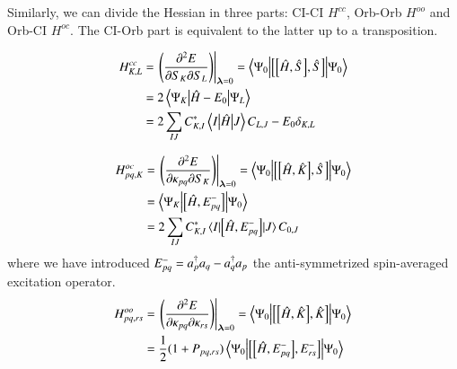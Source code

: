 \documentclass[aps,prb,reprint,showkeys,superscriptaddress]{revtex4-1}
\begin{document}
Similarly, we can divide the Hessian in three parts: CI-CI $H^{cc}$, Orb-Orb $H^{oo}$ and Orb-CI $H^{oc}$. The CI-Orb part is equivalent to the latter up to a transposition.

\begin{align}
  \label{eq:CASSCF_CICI_Hessian}
  H^{cc}_{K,L} &= \eval{\mleft(\pdv{E}{S_{K}}{S_{L}}\mright)}_{\bm{\lambda}=0} = \mel**{\Psi_0}{\com{\com{\hH}{\hS}}{\hS}}{\Psi_0} \\
  &= 2\mel**{\Psi_K}{\hH - E_0}{\Psi_L} \notag \\
  &= 2\sum_{IJ}C_{K,I}^*\mel**{I}{\hH}{J}C_{L,J} - E_0\delta_{K,L} \notag
\end{align}

\begin{align}
  \label{eq:CASSCF_OrbCI_Hessian}
  H^{oc}_{pq,K} &= \eval{\mleft(\pdv{E}{\kappa_{pq}}{S_{K}}\mright)}_{\bm{\lambda}=0} = \mel**{\Psi_0}{\com{\com{\hH}{\hK}}{\hS}}{\Psi_0} \\
                &= \mel**{\Psi_K}{\com{\hH}{E_{pq}^-}}{\Psi_0} \notag \\
                &= 2\sum_{IJ}C_{K,I}^*\mel{I}{\com{\hH}{E_{pq}^-}}{J}C_{0,J} \notag
\end{align}
where we have introduced $E_{pq}^- = a_{p}^\dagger a_{q} - a_{q}^\dagger a_{p}$ the anti-symmetrized spin-averaged excitation operator.
\begin{align}
  \label{eq:MCSCF_SO_OrbOrb_Hessian}
  H^{oo}_{pq,rs} &= \eval{\mleft(\pdv{E}{\kappa_{pq}}{\kappa_{rs}}\mright)}_{\bm{\lambda}=0} = \mel**{\Psi_0}{\com{\com{\hH}{\hK}}{\hK}}{\Psi_0} \\
                   &= \frac{1}{2}(1+P_{pq,rs})\mel**{\Psi_0}{\com{\com{\hH}{E_{pq}^-}}{E_{rs}^-}}{\Psi_0} \notag
\end{align}


\end{document}
